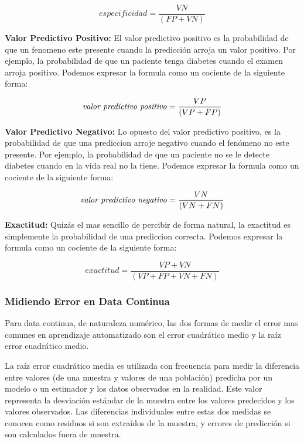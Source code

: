 \begin{spacing}{1.5}
\begin{equation}
especificidad= \frac{VN}{(FP + VN)}
\end{equation}

\textbf{Valor Predictivo Positivo:} El valor predictivo positivo es la probabilidad de que un fenomeno este presente cuando la predicción arroja un valor positivo. Por ejemplo, la probabilidad de que un paciente tenga diabetes cuando el examen arroja positivo. Podemos expresar la formula como un cociente de la siguiente forma:

\begin{equation}
\mbox{\textit{valor predictivo positivo}} = \frac{VP}{(VP + FP)}
\end{equation}

\textbf{Valor Predictivo Negativo:} Lo opuesto del valor predictivo positivo, es la probabilidad de que una prediccion arroje negativo cuando el fenómeno no este presente. Por ejemplo, la probabilidad de que un paciente no se le detecte diabetes cuando en la vida real no la tiene. Podemos expresar la formula como un cociente de la siguiente forma:

\begin{equation}
\mbox{\textit{valor predictivo negativo}} = \frac{VN}{(VN + FN)}
\end{equation}

\textbf{Exactitud:} Quizás el mas sencillo de percibir de forma natural, la exactitud es simplemente la probabilidad de una prediccion correcta. Podemos expresar la formula como un cociente de la siguiente forma:

\begin{equation}
exactitud = \frac{VP + VN}{(VP + FP + VN + FN)}
\end{equation}

\subsubsection{Midiendo Error en Data Continua}
Para data continua, de naturaleza numérico, las dos formas de medir el error mas comunes en aprendizaje automatizado son el error cuadrático medio y la raíz error cuadrático medio. 

La raíz error cuadrático media es utilizada con frecuencia para medir la diferencia entre valores (de una muestra y valores de una población) predicha por un modelo o un estimador y los datos observados en la realidad. Este valor representa la desviación estándar de la muestra entre los valores predecidos y los valores observados. Las diferencias individuales entre estas dos medidas se conocen como residuos si son extraídos de la muestra, y errores de predicción si son calculados fuera de muestra. 


\end{spacing}
